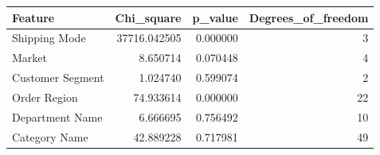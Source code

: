 \begin{tabular}{lrrr}
\toprule
Feature & Chi\_square & p\_value & Degrees\_of\_freedom \\
\midrule
Shipping Mode & 37716.042505 & 0.000000 & 3 \\
Market & 8.650714 & 0.070448 & 4 \\
Customer Segment & 1.024740 & 0.599074 & 2 \\
Order Region & 74.933614 & 0.000000 & 22 \\
Department Name & 6.666695 & 0.756492 & 10 \\
Category Name & 42.889228 & 0.717981 & 49 \\
\bottomrule
\end{tabular}
